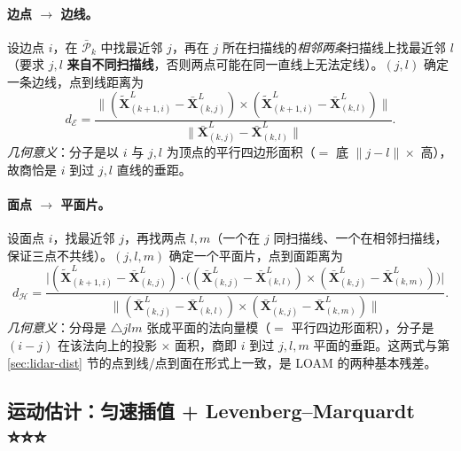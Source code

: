 \paragraph{边点 $\to$ 边线。}
设边点 $i$，在 $\bar{\mathcal{P}}_k$ 中找最近邻 $j$，再在 $j$ 所在扫描线的\emph{相邻两条}扫描线上找最近邻 $l$（要求 $j,l$ \textbf{来自不同扫描线}，否则两点可能在同一直线上无法定线）。$(j,l)$ 确定一条边线，点到线距离为
\begin{equation}
  d_{\mathcal{E}}=\frac{\big\|(\tilde{\mathbf{X}}^L_{(k+1,i)}-\bar{\mathbf{X}}^L_{(k,j)})\times(\tilde{\mathbf{X}}^L_{(k+1,i)}-\bar{\mathbf{X}}^L_{(k,l)})\big\|}{\big\|\bar{\mathbf{X}}^L_{(k,j)}-\bar{\mathbf{X}}^L_{(k,l)}\big\|}.
  \label{eq:lidar-loam-de}
\end{equation}
\emph{几何意义}：分子是以 $i$ 与 $j,l$ 为顶点的平行四边形面积（$=$ 底 $\|j-l\|\times$ 高），故商恰是 $i$ 到过 $j,l$ 直线的垂距。

\paragraph{面点 $\to$ 平面片。}
设面点 $i$，找最近邻 $j$，再找两点 $l,m$（一个在 $j$ 同扫描线、一个在相邻扫描线，保证三点不共线）。$(j,l,m)$ 确定一个平面片，点到面距离为
\begin{equation}
  d_{\mathcal{H}}=\frac{\big|(\tilde{\mathbf{X}}^L_{(k+1,i)}-\bar{\mathbf{X}}^L_{(k,j)})\cdot\big((\bar{\mathbf{X}}^L_{(k,j)}-\bar{\mathbf{X}}^L_{(k,l)})\times(\bar{\mathbf{X}}^L_{(k,j)}-\bar{\mathbf{X}}^L_{(k,m)})\big)\big|}{\big\|(\bar{\mathbf{X}}^L_{(k,j)}-\bar{\mathbf{X}}^L_{(k,l)})\times(\bar{\mathbf{X}}^L_{(k,j)}-\bar{\mathbf{X}}^L_{(k,m)})\big\|}.
  \label{eq:lidar-loam-dh}
\end{equation}
\emph{几何意义}：分母是 $\triangle jlm$ 张成平面的法向量模（$=$ 平行四边形面积），分子是 $(i-j)$ 在该法向上的投影 $\times$ 面积，商即 $i$ 到过 $j,l,m$ 平面的垂距。这两式与第 \ref{sec:lidar-dist} 节的点到线/点到面在形式上一致，是 LOAM 的两种基本残差。

\subsection{运动估计：匀速插值 + Levenberg–Marquardt ⭐⭐⭐}
\label{sec:lidar-loam-motion}

